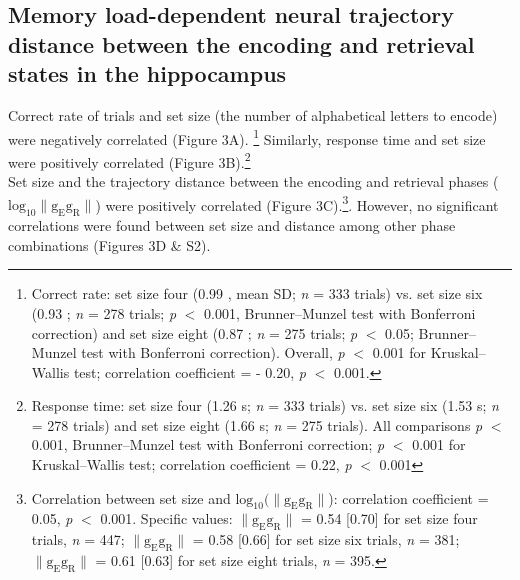 \documentclass[final,3p,times,twocolumn]{elsarticle}
\begin{document}
\subsection{Memory load-dependent neural trajectory distance between the encoding and retrieval states in the hippocampus}
Correct rate of trials and set size (the number of alphabetical letters to encode) were negatively correlated (Figure 3A). \footnote{Correct rate: set size four (0.99 , mean \textpm SD; \textit{n} = 333 trials) vs. set size six (0.93 ; \textit{n} = 278 trials; \textit{p} $<$ 0.001, Brunner--Munzel test with Bonferroni correction) and set size eight (0.87 ; \textit{n} = 275 trials; \textit{p} $<$ 0.05; Brunner--Munzel test with Bonferroni correction). Overall, \textit{p} $<$ 0.001 for Kruskal--Wallis test; correlation coefficient = - 0.20, \textit{p} $<$ 0.001.} Similarly, response time and set size were positively correlated (Figure 3B).\footnote{Response time: set size four (1.26  s; \textit{n} = 333 trials) vs. set size six (1.53  s; \textit{n} = 278 trials) and set size eight (1.66  s; \textit{n} = 275 trials). All comparisons \textit{p} $<$ 0.001, Brunner--Munzel test with Bonferroni correction; \textit{p} $<$ 0.001 for Kruskal--Wallis test; correlation coefficient = 0.22, \textit{p} $<$ 0.001}
\\
\indent
Set size and the trajectory distance between the encoding and retrieval phases ($\mathrm{log_{10}\lVert g_{E}g_{R} \rVert}$) were positively correlated (Figure 3C).\footnote{Correlation between set size and $\mathrm{log_{10}(\lVert g_{E}g_{R} \rVert}$): correlation coefficient = 0.05, \textit{p} $<$ 0.001. Specific values: $\mathrm{\lVert g_{E}g_{R} \rVert}$ = 0.54 [0.70] for set size four trials, \textit{n} = 447; $\mathrm{\lVert g_{E}g_{R} \rVert}$ = 0.58 [0.66] for set size six trials, \textit{n} = 381; $\mathrm{\lVert g_{E}g_{R} \rVert}$ = 0.61 [0.63] for set size eight trials, \textit{n} = 395.}. However, no significant correlations were found between set size and distance among other phase combinations (Figures 3D \& S2).
\end{document}
